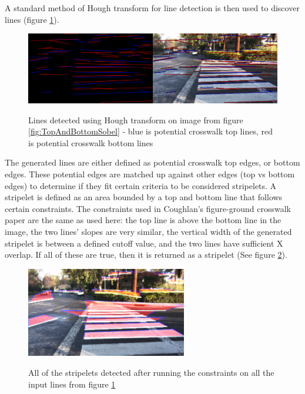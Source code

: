 \documentclass[12pt]{ucthesis}
\newcommand{\captionfonts}{\small\bf\ssp}
\begin{document}
A standard method of Hough transform for line detection is then used to discover lines (figure \ref{fig:HoughLinesAfterMerge}). 

\begin{figure}[t]
\begin{center}
\includegraphics[width=14cm]{HoughLinesAfterMerge.png}
\captionfonts
\caption[Hough Line Transform Detection Result]{Lines detected using Hough transform on image from figure \ref{fig:TopAndBottomSobel} - blue is potential crosswalk top lines, red is potential crosswalk bottom lines}
\label{fig:HoughLinesAfterMerge}
\end{center}
\end{figure}

The generated lines are either defined as potential crosswalk top edges, or bottom edges. These potential edges are matched up against other edges (top vs bottom edges) to determine if they fit certain criteria to be considered stripelets. A stripelet is defined as an area bounded by a top and bottom line that follows certain constraints. The constraints used in Coughlan's figure-ground crosswalk paper \cite{Coughlan2006} are the same as used here: the top line is above the bottom line in the image, the two lines' slopes are very similar, the vertical width of the generated stripelet is between a defined cutoff value, and the two lines have sufficient X overlap. If all of these are true, then it is returned as a stripelet (See figure \ref{fig:UnculledStripelets}). 

\begin{figure}[t]
\begin{center}
\includegraphics[width=7cm]{UnculledStripelets.png}
\captionfonts
\caption[All detected stripelets]{All of the stripelets detected after running the constraints on all the input lines from figure \ref{fig:HoughLinesAfterMerge}}
\label{fig:UnculledStripelets}
\end{center}
\end{figure}
\end{document}
